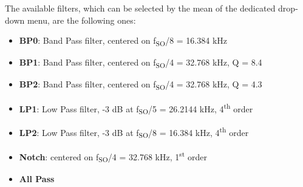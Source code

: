 The available filters, which can be selected by the mean of the dedicated drop-down menu, are the following ones:
\begin{itemize}
    \item \textbf{BP0}: Band Pass filter, centered on f\textsubscript{SO}/8 = 16.384 kHz
    \item \textbf{BP1}: Band Pass filter, centered on f\textsubscript{SO}/4 = 32.768 kHz, Q = 8.4
    \item \textbf{BP2}: Band Pass filter, centered on f\textsubscript{SO}/4 = 32.768 kHz, Q = 4.3
    \item \textbf{LP1}: Low Pass filter, -3 dB at f\textsubscript{SO}/5 = 26.2144 kHz, 4\textsuperscript{th} order
    \item \textbf{LP2}: Low Pass filter, -3 dB at f\textsubscript{SO}/8 = 16.384 kHz, 4\textsuperscript{th} order
    \item \textbf{Notch}: centered on f\textsubscript{SO}/4 = 32.768 kHz, 1\textsuperscript{st} order
    \item \textbf{All Pass}
\end{itemize}